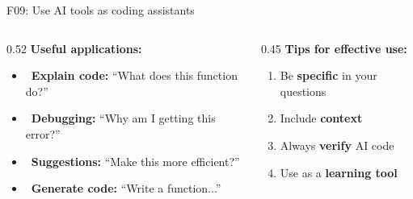 \documentclass[aspectratio=169, 10pt]{beamer}
\begin{document}
\begin{frame}{F09: Use AI tools as coding assistants}
    \begin{columns}[T]
        \begin{column}{0.52\textwidth}
            \textbf{Useful applications:}
            \begin{itemize}
                \item \faCode~\textbf{Explain code:} ``What does this function do?''
                \item \faBug~\textbf{Debugging:} ``Why am I getting this error?''
                \item \faLightbulb~\textbf{Suggestions:} ``Make this more efficient?''
                \item \faPuzzlePiece~\textbf{Generate code:} ``Write a function...''
            \end{itemize}
        \end{column}
        \begin{column}{0.45\textwidth}
            \textbf{Tips for effective use:}
            \begin{enumerate}
                \item Be \textbf{specific} in your questions
                \item Include \textbf{context}
                \item Always \textbf{verify} AI code
                \item Use as a \textbf{learning tool}
            \end{enumerate}
        \end{column}
    \end{columns}


\end{frame}
\end{document}
